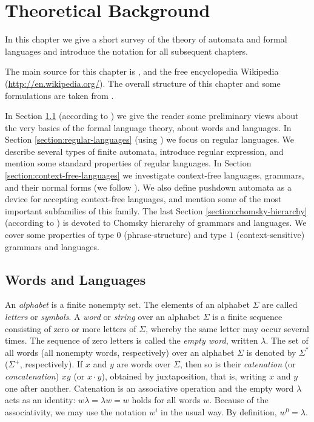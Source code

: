 \chapter{Theoretical Background}
\label{chapter:background}

In this chapter we give a short survey of the theory of automata and formal languages and introduce the notation for all subsequent chapters.

The main source for this chapter is \cite{RozSal97I, HopcroftMotwaniUllman07}, and the free encyclopedia Wikipedia (\url{http://en.wikipedia.org/}). The overall structure of this chapter and some formulations are taken from \cite{C10Diploma}.

In Section \ref{section:words-and-languages} (according to \cite{MaSa1997formal}) we give the reader some preliminary views about the very basics of the formal language theory, about words and languages. In Section \ref{section:regular-languages} (using \cite{Sh1997regular}) we focus on regular languages. We describe several types of finite automata, introduce regular expression, and mention some standard properties of regular languages. In Section \ref{section:context-free-languages} we investigate context-free languages, grammars, and their normal forms (we follow \cite{AuBeBo1997context-free}). We also define pushdown automata as a device for accepting context-free languages, and mention some of the most important subfamilies of this family. The last Section \ref{section:chomsky-hierarchy} (according to \cite{MaSa1997aspects}) is devoted to Chomsky hierarchy of grammars and languages. We cover some properties  of type $0$ (phrase-structure) and type $1$ (context-sensitive) grammars and languages.

\section{Words and Languages}
\label{section:words-and-languages}

An \emph{alphabet} is a finite nonempty set. The elements of an alphabet $\Sigma$ are called \emph{letters} or \emph{symbols}. A \emph{word} or \emph{string} over an alphabet $\Sigma$ is a finite sequence consisting of zero or more letters of $\Sigma$, whereby the same letter may occur several times. The sequence of zero letters is called the  \emph{empty word}, written $\lambda$. The set of all words (all nonempty words, respectively) over an alphabet $\Sigma$ is denoted by $\Sigma^*$ ($\Sigma^+$, respectively). If $x$ and $y$ are words over $\Sigma$, then so is their \emph{catenation} (or \emph{concatenation}) $xy$ (or $x \cdot y$), obtained by juxtaposition, that is, writing $x$ and $y$ one after another. Catenation is an associative operation and the empty word $\lambda$ acts as an identity: $w \lambda = \lambda w = w$ holds for all words $w$. Because of the associativity, we may use the notation $w^i$ in the usual way. By definition, $w^0 = \lambda$.

